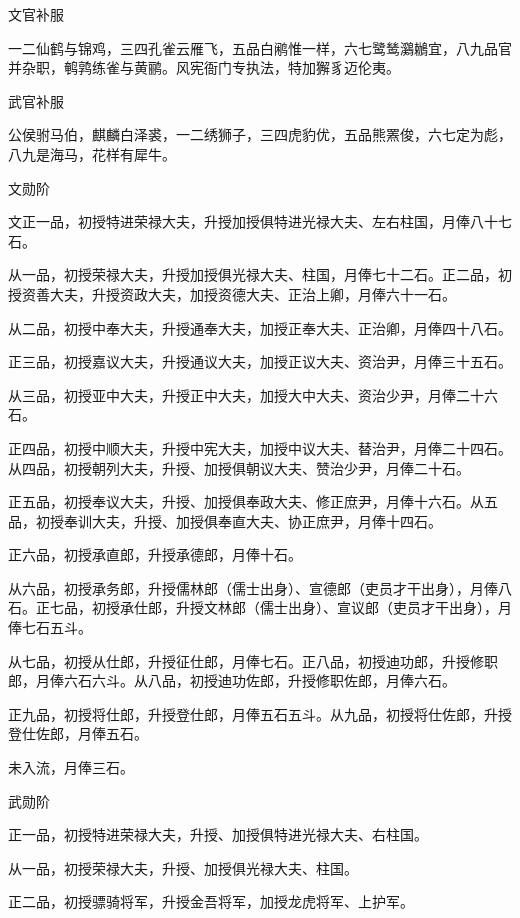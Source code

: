 \documentclass[a4paper,12pt,UTF8,twoside]{ctexbook}
\begin{document}
    文官补服
    
    一二仙鹤与锦鸡，三四孔雀云雁飞，五品白鹇惟一样，六七鹭鸶鸂鶒宜，八九品官并杂职，鹌鹑练雀与黄鹂。风宪衙门专执法，特加獬豸迈伦夷。
    
    武官补服
    
    公侯驸马伯，麒麟白泽裘，一二绣狮子，三四虎豹优，五品熊罴俊，六七定为彪，八九是海马，花样有犀牛。
    
    文勋阶
    
    文正一品，初授特进荣禄大夫，升授加授俱特进光禄大夫、左右柱国，月俸八十七石。
    
    从一品，初授荣禄大夫，升授加授俱光禄大夫、柱国，月俸七十二石。正二品，初授资善大夫，升授资政大夫，加授资德大夫、正治上卿，月俸六十一石。
    
    从二品，初授中奉大夫，升授通奉大夫，加授正奉大夫、正治卿，月俸四十八石。
    
    正三品，初授嘉议大夫，升授通议大夫，加授正议大夫、资治尹，月俸三十五石。
    
    从三品，初授亚中大夫，升授正中大夫，加授大中大夫、资治少尹，月俸二十六石。
    
    正四品，初授中顺大夫，升授中宪大夫，加授中议大夫、替治尹，月俸二十四石。从四品，初授朝列大夫，升授、加授俱朝议大夫、赞治少尹，月俸二十石。
    
    正五品，初授奉议大夫，升授、加授俱奉政大夫、修正庶尹，月俸十六石。从五品，初授奉训大夫，升授、加授俱奉直大夫、协正庶尹，月俸十四石。
    
    正六品，初授承直郎，升授承德郎，月俸十石。
    
    从六品，初授承务郎，升授儒林郎（儒士出身）、宣德郎（吏员才干出身），月俸八石。正七品，初授承仕郎，升授文林郎（儒士出身）、宣议郎（吏员才干出身），月俸七石五斗。
    
    从七品，初授从仕郎，升授征仕郎，月俸七石。正八品，初授迪功郎，升授修职郎，月俸六石六斗。从八品，初授迪功佐郎，升授修职佐郎，月俸六石。
    
    正九品，初授将仕郎，升授登仕郎，月俸五石五斗。从九品，初授将仕佐郎，升授登仕佐郎，月俸五石。
    
    未入流，月俸三石。
    
    武勋阶
    
    正一品，初授特进荣禄大夫，升授、加授俱特进光禄大夫、右柱国。
    
    从一品，初授荣禄大夫，升授、加授俱光禄大夫、柱国。
    
    正二品，初授骠骑将军，升授金吾将军，加授龙虎将军、上护军。
    
\end{document}
